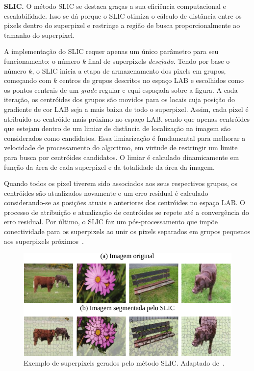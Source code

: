 \noindent
\textbf{SLIC.}
O método SLIC se destaca graças a sua eficiência computacional e escalabilidade.
Isso se dá porque o SLIC otimiza o cálculo de distância entre os pixels dentro do superpixel e restringe a região de busca proporcionalmente ao tamanho do superpixel.

A implementação do SLIC requer apenas um único parâmetro para seu funcionamento: o número $k$ final de superpixels \textit{desejado}. 
Tendo por base o número $k$, o SLIC inicia a etapa de armazenamento dos pixels em grupos, começando com $k$ centros de grupos descritos no espaço LAB e escolhidos como os pontos centrais de um \textit{grade} regular e equi-espaçada sobre a figura.
A cada iteração, os centróides dos grupos são movidos para os locais cuja posição do gradiente de cor LAB seja a mais baixa de todo o superpixel.
Assim, cada pixel é atribuído ao centróide mais próximo no espaço LAB, sendo que apenas centróides que estejam dentro de um limiar de distância de localização na imagem são considerados como candidatos.
Essa limiarização é fundamental para melhorar a velocidade de processamento do algoritmo, em virtude de restringir um limite para busca por centróides candidatos.
O limiar é calculado dinamicamente em função da área de cada superpixel e da totalidade da área da imagem.

Quando todos os pixel tiverem sido associados aos seus respectivos grupos, os centróides são atualizados novamente e um erro residual é calculado considerando-se as posições atuais e anteriores dos centróides no espaço LAB.
O processo de atribuição e atualização de centróides se repete até a convergência do erro residual.
Por último, o SLIC faz um pós-processamento que impõe conectividade para os superpixels ao unir os pixels separados em grupos pequenos aos superpixels próximos~\cite{Achanta2012}.

\begin{figure}[!t]
\centering
\includegraphics[scale=1]{_fig/ie_slic.pdf}
\vspace{-8px}
\caption[Exemplo de superpixels gerados pelo método SLIC]{Exemplo de superpixels gerados pelo método SLIC.
Adaptado de~.}
\label{fig:ie_slic}
\end{figure}

